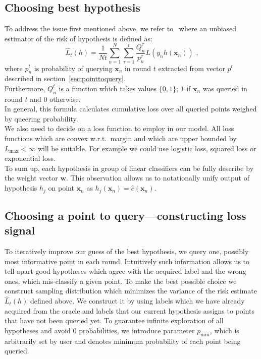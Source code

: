 \documentclass[12pt, a4paper, pdflatex, leqno, twoside]{report}
\begin{document}
\subsection{Choosing best hypothesis\label{sec:risk}}
To address the issue first mentioned above, we refer 
to~\citep{DBLP:journals/corr/GantiG13} where an unbiased estimator of the risk 
of hypothesis is defined as:\\
\begin{equation}\label{eq:mean}
\hat{L}_t(h) = \frac{1}{Nt} \sum_{n=1}^{N} \sum_{\tau = 1}^{t} 
\frac{Q^{\tau}_n}{p^{\tau}_n} L(y_n h(\mathbf{x}_n)) \text{~,}
\end{equation}
where $p^t_n$ is probability of querying $\mathbf{x}_n$ in round $t$ extracted 
from vector $p^t$ described in section~\ref{sec:pointtoquery}.\\
Furthermore, $Q^t_n$ is a function which takes values $\{0,1\}$; $1$ if 
$\mathbf{x}_n$ was queried in round $t$ and $0$ otherwise.\\

In general, this formula calculates cumulative loss over all queried points weighed by queering probability.\\

We also need to decide on a loss function to employ in our model. All loss 
functions which are convex w.r.t.\ margin and which are upper bounded by 
$L_{\text{max}} < \infty$ will be suitable. For example we could use logistic 
loss, squared loss or exponential loss.\\

To sum up, each hypothesis in group of linear classifiers can be fully describe 
by the weight vector $\mathbf{w}$. This observation allows us to notationally unify 
output of hypothesis $h_j$ on point $\mathbf{x}_n$ as $h_j(\mathbf{x}_n) = 
\hat{c}(\mathbf{x}_n)$.\\


\subsection{Choosing a point to query---constructing loss 
signal\label{sec:pointtoquery}}
To iteratively improve our guess of the best hypothesis, we query one, possibly most 
informative point in each round. Intuitively such information allows us to tell 
apart good hypotheses which agree with the acquired label and the wrong ones, which mis-classify a given point. To make the best possible choice we construct sampling 
distribution which minimizes the variance of the risk estimate $\hat{L}_t(h)$ 
defined above. We construct it by using labels which we have already acquired from the oracle and labels that our current hypothesis assigns to points 
that have not been queried yet. To guarantee infinite exploration of all 
hypotheses and avoid $0$ probabilities, we introduce parameter $p_{min}$, which 
is arbitrarily set by user and denotes minimum probability of each point being 
queried.\\
\end{document}
